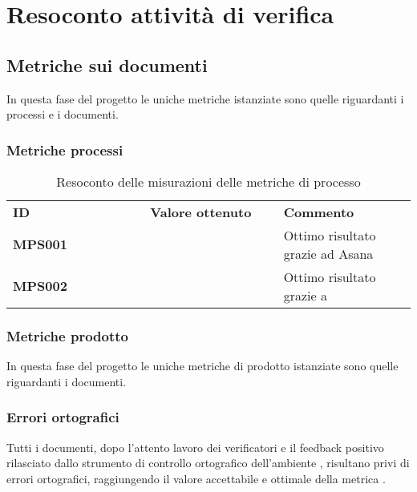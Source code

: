 \documentclass[PianoDiQualifica.tex]{subfiles}
\begin{document}
\chapter{Resoconto attività di verifica}
\section{Metriche sui documenti}
In questa fase del progetto le uniche metriche istanziate sono quelle riguardanti i processi e i documenti.
\subsection{Metriche processi}
\begin{table}[H]
	\begin{center}
		\begin{tabu} to 
			\tableHeaderStyle
			\textbf{ID} & \textbf{Valore ottenuto} & \textbf{Commento} \\%
			\textbf{MPS001} &  & Ottimo risultato grazie ad Asana \\
			\textbf{MPS002} &  & Ottimo risultato grazie a \\
		\end{tabu}
		\caption{Resoconto delle misurazioni delle metriche di processo}
		\vspace{-1em}
	\end{center}
\end{table}

\subsection{Metriche prodotto}
In questa fase del progetto le uniche metriche di prodotto istanziate sono quelle riguardanti i documenti.
\subsection{Errori ortografici}
Tutti i documenti, dopo l'attento lavoro dei verificatori e il feedback positivo rilasciato dallo strumento di controllo ortografico dell'ambiente , risultano privi di errori ortografici, raggiungendo il valore accettabile e ottimale della metrica .
\end{document}

